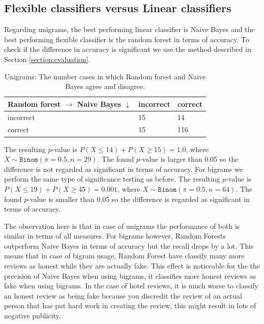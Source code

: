 \documentclass[a4paper,11pt]{article}
\begin{document}
\subsection{Flexible classifiers versus Linear classifiers}
Regarding unigrams, the best performing linear classifier is Naive Bayes and the best performing flexible classifier is the random forest in terms of accuracy. To check if the difference in accuracy is significant we use the method described in Section \ref{section:evaluation}. 
\begin{table}[H]
\centering
\caption{Unigrams: The number cases in which Random forest and Naive Bayes agree and disagree.}
\label{table:flexLinUni}
\begin{tabular}{|l|l|l|}
\hline
\shortstack{Random forest $\rightarrow$ \\ Naive Bayes $\downarrow$} & incorrect & correct \\
\hline
incorrect   & 15   &  14   \\
correct & 15   &   116   \\
\hline
\end{tabular}
\end{table}
The resulting $p$-value is $P(X \leq  14) + P(X \geq 15) = 1.0$, where $X \sim \texttt{Binom}(\pi = 0.5, n =29)$. The found $p$-value is larger than 0.05 so the difference is not regarded as significant in terms of accuracy.
For bigrams we perform the same type of significance testing as before. The resulting $p$-value is $P(X \leq  19) + P(X \geq 45) = 0.001$, where $X \sim \texttt{Binom}(\pi = 0.5, n =64)$. The found $p$-value is smaller than 0.05 so the difference is regarded as significant in terms of accuracy. 

The observation here is that in case of unigrams the performance of both is similar in terms of all measures. For bigrams however, Random Forests outperform Naive Bayes in terms of accuracy but the recall drops by a lot. This means that in case of bigram usage, Random Forest have classify many more reviews as honest while they are actually fake. This effect is noticeable for the the precision of Naive Bayes when using bigrams, it classifies more honest reviews as fake when using bigrams. In the case of hotel reviews, it is much worse to classify an honest review as being fake because you discredit the review of an actual person that has put hard work in creating the review, this might result in lots of negative publicity.  
\end{document}

